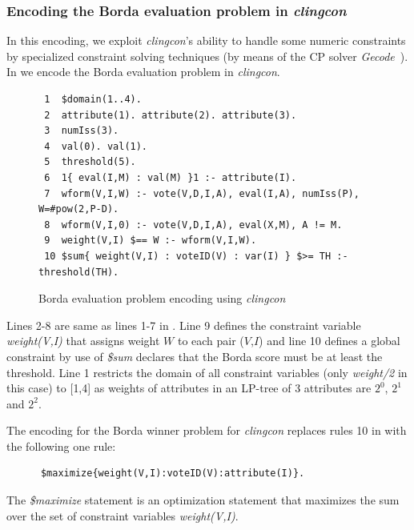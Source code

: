 \subsubsection{Encoding the Borda evaluation problem in \emph{clingcon}}
In this encoding, we exploit \emph{clingcon}'s ability to handle some 
numeric constraints by specialized constraint solving techniques (by
means of the CP solver \emph{Gecode}~\cite{Schulte:gecode}). In 
 we encode the Borda evaluation problem 
in \emph{clingcon}.

\begin{figure}
  \begin{framed}
  \small
    \begin{verbatim}
 1  $domain(1..4).
 2  attribute(1). attribute(2). attribute(3).
 3  numIss(3).
 4  val(0). val(1).
 5  threshold(5).
 6  1{ eval(I,M) : val(M) }1 :- attribute(I).
 7  wform(V,I,W) :- vote(V,D,I,A), eval(I,A), numIss(P), W=#pow(2,P-D).
 8  wform(V,I,0) :- vote(V,D,I,A), eval(X,M), A != M.
 9  weight(V,I) $== W :- wform(V,I,W).
 10 $sum{ weight(V,I) : voteID(V) : var(I) } $>= TH :- threshold(TH).
    \end{verbatim}
  \end{framed}
  \caption{\small Borda evaluation problem encoding using \emph{clingcon}}
  \label{fig:clingcon:bordaEval}
\end{figure}
Lines 2-8 are same as lines 1-7 in .
Line 9 defines the constraint variable \textit{weight(V,I)} that assigns weight $W$ to
each pair ($V$,$I$)
and line 10 defines a global constraint by use of \textit{\$sum}
declares that the Borda score must be at least the threshold.
Line 1 restricts the domain of all constraint variables
(only \textit{weight/2} in this case) to {[}1,4{]} as weights of attributes
in an LP-tree of 3 attributes are $2^0$, $2^1$ and $2^2$.

The encoding for the Borda winner problem for \emph{clingcon} 
replaces rules 10 in  with the following 
one rule:
  \begin{framed}
  \small
    \begin{verbatim}
      $maximize{weight(V,I):voteID(V):attribute(I)}.
    \end{verbatim}
  \end{framed}
The \textit{\$maximize} statement is an optimization statement 
that maximizes the sum over the set of constraint variables \textit{weight(V,I)}.


